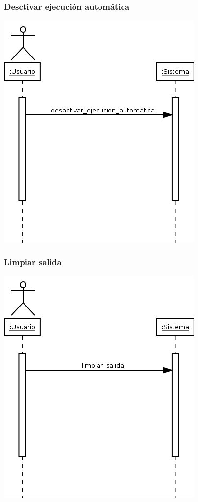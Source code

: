 \subsubsection{Desctivar ejecución automática}
\begin{center}
\includegraphics[scale=0.4]{desactivar_ejecucion_automatica.png} \\
\end{center}
\subsubsection{Limpiar salida}
\begin{center}
\includegraphics[scale=0.4]{limpiar_salida.png} \\
\end{center}
